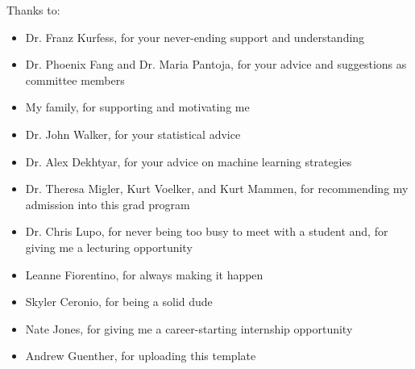 \noindent
Thanks to:
\begin{itemize}
    \item Dr. Franz Kurfess, for your never-ending support and understanding
    \item Dr. Phoenix Fang and Dr. Maria Pantoja, for your advice and suggestions as committee members
    \item My family, for supporting and motivating me
    \item Dr. John Walker, for your statistical advice
    \item Dr. Alex Dekhtyar, for your advice on machine learning strategies
    \item Dr. Theresa Migler, Kurt Voelker, and Kurt Mammen, for recommending my admission into this grad program
    \item Dr. Chris Lupo, for never being too busy to meet with a student and, for giving me a lecturing opportunity
    \item Leanne Fiorentino, for always making it happen
    \item Skyler Ceronio, for being a solid dude
    \item Nate Jones, for giving me a career-starting internship opportunity
    \item Andrew Guenther, for uploading this template
\end{itemize}
